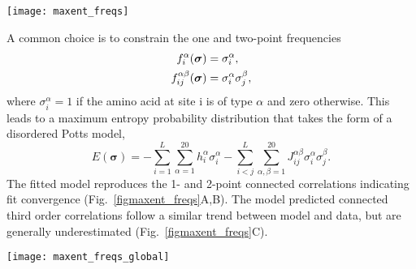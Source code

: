 \begin{figure*}
    \texttt{[image: maxent\_freqs]}
    \caption{Connected correlation functions of a maximum entropy model based on 1 and 2-point frequencies ressemble those of the training test set (upper row) within the training and test set error (lower row). Color indicates local density in regions with overplotting.
    \label{figmaxent_freqs}
    }
\end{figure*}

A common choice is to constrain the one and two-point frequencies
\begin{align}
    f_i^\alpha(\boldsymbol \sigma) &= \sigma_i^\alpha, \\
    f_{ij}^{\alpha\beta}(\boldsymbol \sigma) &= \sigma_i^\alpha \sigma_j^\beta,
\end{align}
where $\sigma_i^\alpha = 1$ if the amino acid at site i is of type $\alpha$ and zero otherwise.
This leads to a maximum entropy probability distribution that takes the form of a disordered Potts model,
\begin{equation}
    E(\boldsymbol \sigma) = - \sum_{i=1}^L \sum_{\alpha = 1}^{20} h_i^\alpha \sigma_i^\alpha - \sum_{i<j}^L \sum_{\alpha,\beta = 1}^{20} J_{ij}^{\alpha \beta}  \sigma_i^\alpha \sigma_j^\beta.
\end{equation}
The fitted model reproduces the 1- and 2-point connected correlations indicating fit convergence (Fig.~\ref{figmaxent_freqs}A,B). The model predicted connected third order correlations follow a similar trend between model and data, but are generally underestimated (Fig.~\ref{figmaxent_freqs}C).


\begin{figure*}
    \texttt{[image: maxent\_freqs\_global]}
    \caption{Correlation between compositional Maxent model and test set (upper row) and training and test set (lower row) for the first three connected correlation functions.
    \label{figmaxent_freqs_global}
    }
\end{figure*}

